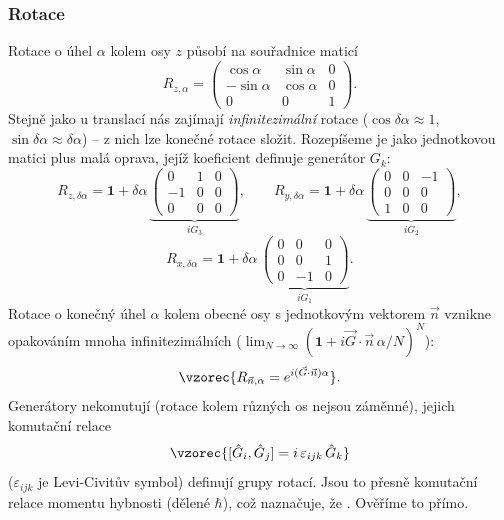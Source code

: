 \subsubsection{Rotace}
Rotace o úhel \(\alpha\) kolem osy \(z\) působí na souřadnice maticí
\[
  R_{z,\alpha} = \begin{pmatrix} \cos\alpha & \sin\alpha & 0\\ -\sin\alpha & \cos\alpha & 0\\ 0 & 0 & 1\end{pmatrix}.
\]
Stejně jako u translací nás zajímají \emph{infinitezimální} rotace
(\(\cos\delta\alpha\approx 1\), \(\sin\delta\alpha\approx\delta\alpha\)) –
z nich lze konečné rotace složit. Rozepíšeme je jako jednotkovou matici
plus malá oprava, jejíž koeficient definuje generátor \(G_k\):
\[
  R_{z,\delta\alpha} = \mathbf{1} + \delta\alpha\,
  \underbrace{\begin{pmatrix} 0 & 1 & 0\\ -1 & 0 & 0\\ 0 & 0 & 0\end{pmatrix}}_{iG_3},
  \qquad
  R_{y,\delta\alpha} = \mathbf{1} + \delta\alpha\,
  \underbrace{\begin{pmatrix} 0 & 0 & -1\\ 0 & 0 & 0\\ 1 & 0 & 0\end{pmatrix}}_{iG_2},
\]
\[
  R_{x,\delta\alpha} = \mathbf{1} + \delta\alpha\,
  \underbrace{\begin{pmatrix} 0 & 0 & 0\\ 0 & 0 & 1\\ 0 & -1 & 0\end{pmatrix}}_{iG_1}.
\]
Rotace o konečný úhel \(\alpha\) kolem obecné osy s jednotkovým vektorem
\(\vec n\) vznikne opakováním mnoha infinitezimálních
(\(\lim_{N\to\infty}(\mathbf{1} + i\vec G\cdot\vec n\,\alpha/N)^N\)):
\[
  \vzorec{R_{\vec n,\alpha} = e^{i(\vec G\cdot\vec n)\alpha}} .
\]
Generátory nekomutují (rotace kolem různých os nejsou záměnné), jejich
komutační relace
\[
  \vzorec{[\hat G_i, \hat G_j] = i\,\varepsilon_{ijk}\,\hat G_k}
\]
(\(\varepsilon_{ijk}\) je Levi-Civitův symbol) definují 
grupy rotací. Jsou to přesně komutační relace momentu hybnosti
(dělené \(\hbar\)), což naznačuje, že . Ověříme to přímo.

